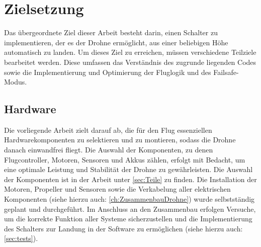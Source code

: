 \chapter{Zielsetzung}

Das übergeordnete Ziel dieser Arbeit besteht darin, einen Schalter zu implementieren, der es der Drohne ermöglicht, aus einer beliebigen Höhe automatisch zu landen. Um dieses Ziel zu erreichen, müssen verschiedene Teilziele bearbeitet werden. Diese umfassen das Verständnis des zugrunde liegenden Codes sowie die Implementierung und Optimierung der Fluglogik und des Failsafe-Modus.

\section{Hardware}

Die vorliegende Arbeit zielt darauf ab, die für den Flug essenziellen Hardwarekomponenten zu selektieren und zu montieren, sodass die Drohne danach einwandfrei fliegt. Die Auswahl der Komponenten, zu denen Flugcontroller, Motoren, Sensoren und Akkus zählen, erfolgt mit Bedacht, um eine optimale Leistung und Stabilität der Drohne zu gewährleisten. Die Auswahl der Komponenten ist in der Arbeit unter \autoref{sec:Teile} zu finden. Die Installation der Motoren, Propeller und Sensoren sowie die Verkabelung aller elektrischen Komponenten (siehe hierzu auch: \autoref{ch:ZusammenbauDrohne}) wurde selbstständig geplant und durchgeführt. Im Anschluss an den Zusammenbau erfolgen Versuche, um die korrekte Funktion aller Systeme sicherzustellen und die Implementierung des Schalters zur Landung in der Software zu ermöglichen (siehe hierzu auch: \autoref{sec:tests}).



